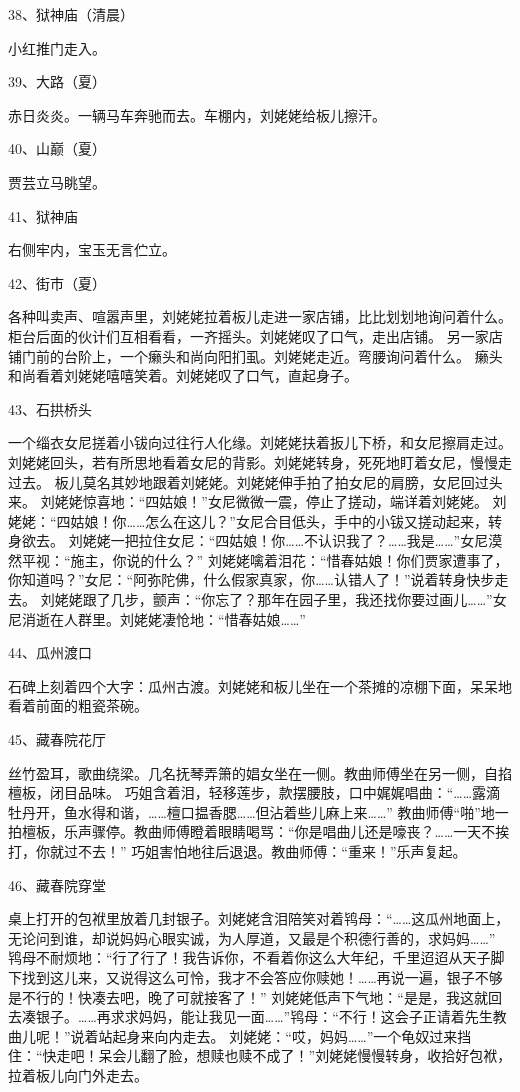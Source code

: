 38、狱神庙（清晨）\par
小红推门走入。

39、大路（夏）\par
赤日炎炎。一辆马车奔驰而去。车棚内，刘姥姥给板儿擦汗。

40、山巅（夏）\par
贾芸立马眺望。

41、狱神庙\par
右侧牢内，宝玉无言伫立。

42、街市（夏）\par
各种叫卖声、喧嚣声里，刘姥姥拉着板儿走进一家店铺，比比划划地询问着什么。
柜台后面的伙计们互相看看，一齐摇头。刘姥姥叹了口气，走出店铺。
另一家店铺门前的台阶上，一个癞头和尚向阳扪虱。刘姥姥走近。弯腰询问着什么。
癞头和尚看着刘姥姥嘻嘻笑着。刘姥姥叹了口气，直起身子。

43、石拱桥头\par
一个缁衣女尼搓着小钹向过往行人化缘。刘姥姥扶着扳儿下桥，和女尼擦肩走过。
刘姥姥回头，若有所思地看着女尼的背影。刘姥姥转身，死死地盯着女尼，慢慢走过去。
板儿莫名其妙地跟着刘姥姥。刘姥姥伸手拍了拍女尼的肩膀，女尼回过头来。
刘姥姥惊喜地：“四姑娘！”女尼微微一震，停止了搓动，端详着刘姥姥。
刘姥姥：“四姑娘！你……怎么在这儿？”女尼合目低头，手中的小钹又搓动起来，转身欲去。
刘姥姥一把拉住女尼：“四姑娘！你……不认识我了？……我是……”女尼漠然平视：“施主，你说的什么？”
刘姥姥噙着泪花：“惜春姑娘！你们贾家遭事了，你知道吗？”女尼：“阿弥陀佛，什么假家真家，你……认错人了！”说着转身快步走去。
刘姥姥跟了几步，颤声：“你忘了？那年在园子里，我还找你要过画儿……”女尼消逝在人群里。刘姥姥凄怆地：“惜春姑娘……”

44、瓜州渡口\par
石碑上刻着四个大字：瓜州古渡。刘姥姥和板儿坐在一个茶摊的凉棚下面，呆呆地看着前面的粗瓷茶碗。

45、藏春院花厅\par
丝竹盈耳，歌曲绕梁。几名抚琴弄箫的娼女坐在一侧。教曲师傅坐在另一侧，自掐檀板，闭目品味。
巧姐含着泪，轻移莲步，款摆腰肢，口中娓娓唱曲：“……露滴牡丹开，鱼水得和谐，……檀口揾香腮……但沾着些儿麻上来……”
教曲师傅“啪”地一拍檀板，乐声骤停。教曲师傅瞪着眼睛喝骂：“你是唱曲儿还是嚎丧？……一天不挨打，你就过不去！”
巧姐害怕地往后退退。教曲师傅：“重来！”乐声复起。

46、藏春院穿堂\par
桌上打开的包袱里放着几封银子。刘姥姥含泪陪笑对着鸨母：“……这瓜州地面上，无论问到谁，却说妈妈心眼实诚，为人厚道，又最是个积德行善的，求妈妈……”
鸨母不耐烦地：“行了行了！我告诉你，不看着你这么大年纪，千里迢迢从天子脚下找到这儿来，又说得这么可怜，我才不会答应你赎她！……再说一遍，银子不够是不行的！快凑去吧，晚了可就接客了！”
刘姥姥低声下气地：“是是，我这就回去凑银子。……再求求妈妈，能让我见一面……”鸨母：“不行！这会子正请着先生教曲儿呢！”说着站起身来向内走去。
刘姥姥：“哎，妈妈……”一个龟奴过来挡住：“快走吧！呆会儿翻了脸，想赎也赎不成了！”刘姥姥慢慢转身，收拾好包袱，拉着板儿向门外走去。

